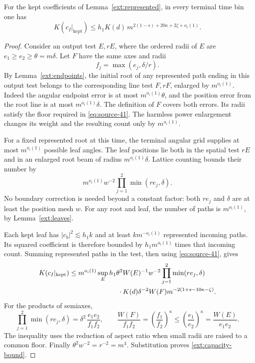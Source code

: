 \begin{lemma}\label{ext:capacity}
For the kept coefficients of Lemma~\ref{ext:represented}, in
every terminal time bin one has
\begin{equation}\label{ext:capacity-bound}
 K(c_I|_{\mathrm{kept}})
 \leq h_1K(d)\,
          m^{2(1-s)+20\kappa+2\zeta+o_i(1)}.
\end{equation}
\end{lemma}

\begin{proof}
Consider an output test \(E,rE\), where the ordered radii of
\(E\) are \(e_1\geq e_2\geq\theta=m\delta\).
Let \(F\) have the same axes and radii
\[
                              f_j=\max(e_j,\delta/r).
\]
By Lemma~\ref{ext:endpoints}, the initial root of any represented
path ending in this output test belongs to the corresponding
line test \(F,rF\), enlarged by \(m^{o_i(1)}\).
Indeed the angular endpoint error is at most
\(m^{o_i(1)}\theta\), and the position error from the root line
is at most \(m^{o_i(1)}\delta\). The definition of \(F\) covers
both errors. Its radii satisfy the floor required in
\eqref{eq:source-41}. The harmless power enlargement changes
its weight and the resulting count only by \(m^{o_i(1)}\).

For a fixed represented root at this time, the terminal angular
grid supplies at most \(m^{o_i(1)}\) possible leaf angles.
The leaf positions lie both in the spatial test \(rE\) and in
an enlarged root beam of radius \(m^{o_i(1)}\delta\).
Lattice counting bounds their number by
\[
        m^{o_i(1)}w^{-2}\prod_{j=1}^2\min(re_j,\delta).
\]
No boundary correction is needed beyond a constant factor:
both \(re_j\) and \(\delta\) are at least the position mesh \(w\).
For any root and leaf, the number of paths is
\(m^{o_i(1)}\), by Lemma~\ref{ext:leaves}.

Each kept leaf has \(|c_b|^2\lesssim h_1k\) and at least
\(k m^{-o_i(1)}\) represented incoming paths. Its squared
coefficient is therefore bounded by \(h_1m^{o_i(1)}\) times
that incoming count. Summing represented paths in the test,
then using \eqref{eq:source-41}, gives
\begin{align*}
 K(c_I|_{\mathrm{kept}})
 &\leq m^{o_i(1)}
 \sup_E h_1\theta^2W(E)^{-1}
     w^{-2}\prod_{j=1}^2\min(re_j,\delta)\\
 &\hspace{25mm}\cdot
 K(d)\delta^{-2}W(F)
       m^{-2(1+s-10\kappa-\zeta)} .
\end{align*}
For the products of semiaxes,
\[
 \prod_{j=1}^2\min(re_j,\delta)
       =\delta^2\,\frac{e_1e_2}{f_1f_2},
 \qquad
 \frac{W(F)}{f_1f_2}
       =\left(\frac{f_1}{f_2}\right)^\kappa
       \leq\left(\frac{e_1}{e_2}\right)^\kappa
       =\frac{W(E)}{e_1e_2}.
\]
The inequality uses the reduction of aspect ratio when small
radii are raised to a common floor. Finally
\(\theta^2w^{-2}=r^{-2}=m^4\). Substitution proves
\eqref{ext:capacity-bound}.
\end{proof}

